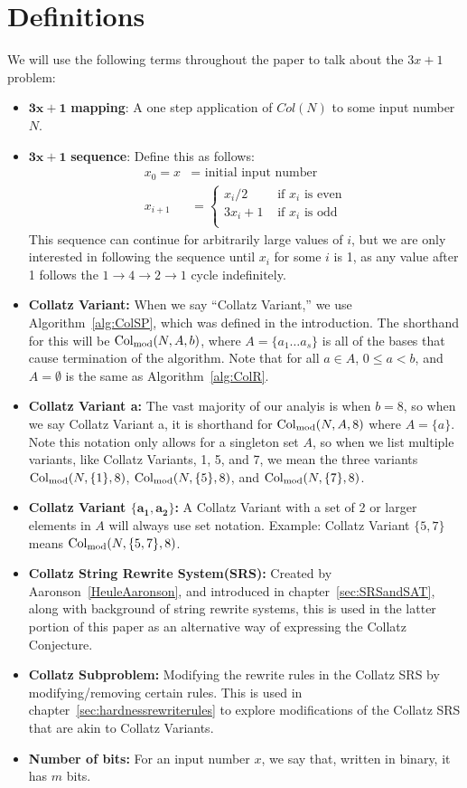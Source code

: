\chapter{Definitions} \label{sec:defns}
We will use the following terms throughout the paper to talk about the $3x+1$ problem:
\begin{itemize}
    \item $\boldsymbol{3x+1}$\textbf{ mapping}: A one step application of $Col(N)$ to some input number $N$.
    \item $\boldsymbol{3x+1}$\textbf{ sequence}: Define this as follows: 
    \begin{align*}
        x_0 = x &= \text{ initial input number} \\
        x_{i+1} &= \begin{cases} 
        x_{i}/2 &\text{ if $x_i$ is even} \\
        3 x_{i} + 1 &\text{ if $x_i$ is odd} \\
        \end{cases}
    \end{align*}
    This sequence can continue for arbitrarily large values of $i$, but we are only interested in following the sequence until $x_i$ for some $i$ is 1, as any value after 1 follows the $1 \rightarrow 4 \rightarrow 2 \rightarrow 1$ cycle indefinitely.
    \item \textbf{Collatz Variant:} When we say ``Collatz Variant,'' we use Algorithm~\ref{alg:ColSP}, which was defined in the introduction. The shorthand for this will be $\mathrm{Col}_{\text{mod}}(N,A,b)$, where $A = \{a_1 \ldots a_s\}$ is all of the bases that cause termination of the algorithm. Note that for all $a \in A$, $0 \le a < b$, and $A = \emptyset$ is the same as Algorithm~\ref{alg:ColR}.
    \item \textbf{Collatz Variant a:} The vast majority of our analyis is when $b = 8$, so when we say Collatz Variant a, it is shorthand for $\mathrm{Col}_{\text{mod}}(N,A,8)$ where $A = \{a\}$. Note this notation only allows for a singleton set $A$, so when we list multiple variants, like Collatz Variants, 1, 5, and 7, we mean the three variants $\mathrm{Col}_{\text{mod}}(N,\{1\},8)$, $\mathrm{Col}_{\text{mod}}(N,\{5\},8)$, and $\mathrm{Col}_{\text{mod}}(N,\{7\},8)$. 
    \item \textbf{Collatz Variant $\boldsymbol{\{a_1,a_2\}}$:} A Collatz Variant with a set of 2 or larger elements in $A$ will always use set notation. Example: Collatz Variant $\{5,7\}$ means $\mathrm{Col}_{\text{mod}}(N,\{5,7\},8)$.
    \item \textbf{Collatz String Rewrite System(SRS):} Created by Aaronson~\ref{HeuleAaronson}, and introduced in chapter~\ref{sec:SRSandSAT}, along with background of string rewrite systems, this is used in the latter portion of this paper as an alternative way of expressing the Collatz Conjecture.
    \item \textbf{Collatz Subproblem:} Modifying the rewrite rules in the Collatz SRS by modifying/removing certain rules. This is used in chapter~\ref{sec:hardnessrewriterules} to explore modifications of the Collatz SRS that are akin to Collatz Variants.
    \item \textbf{Number of bits:} For an input number $x$, we say that, written in binary, it has $m$ bits.
\end{itemize}
